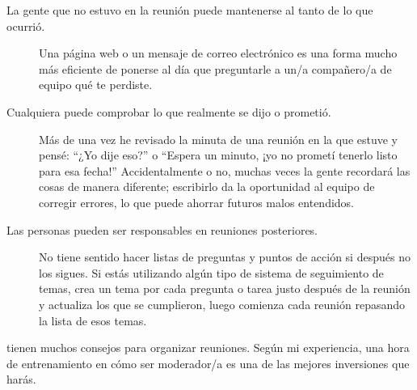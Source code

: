 \begin{description}

\item[La gente que no estuvo en la reunión puede mantenerse al tanto de lo que ocurrió.]
  Una página web o un mensaje de correo electrónico es una forma mucho más eficiente de ponerse al día
  que preguntarle a un/a compañero/a de equipo qué te perdiste.

\item[Cualquiera puede comprobar lo que realmente se dijo o prometió.]
  Más de una vez
  he revisado la minuta de una reunión en la que estuve
  y pensé: ``¿Yo dije eso?''
  o ``Espera un minuto, ¡yo no prometí tenerlo listo para esa fecha!''
  Accidentalmente o no,
  muchas veces la gente recordará las cosas de manera diferente;
  escribirlo da la oportunidad al equipo de corregir errores,
  lo que puede ahorrar futuros malos entendidos.

\item[Las personas pueden ser responsables en reuniones posteriores.]
  No tiene sentido hacer listas de preguntas y puntos de acción
  si después no los sigues.
  Si estás utilizando algún tipo de sistema de seguimiento de temas,
  crea un tema por cada pregunta o tarea justo después de la reunión
  y actualiza los que se cumplieron,
  luego comienza cada reunión repasando la lista de esos temas.

\end{description}

\cite{Brow2007,Broo2016,Roge2018} tienen muchos consejos para organizar reuniones.
Según mi experiencia,
una hora de entrenamiento en cómo ser moderador/a
es una de las mejores inversiones que harás.

